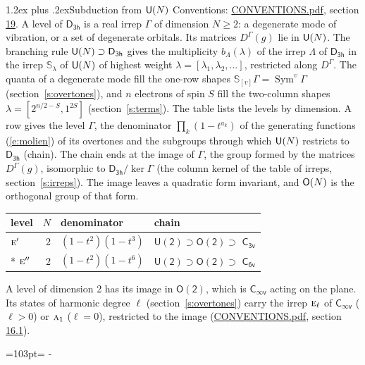 \documentclass[10pt,a4paper]{article}
\makeatletter
\renewcommand\section{\@startsection{section}{1}{\z@}{-3ex plus -1ex minus -.2ex}%
  {1.2ex plus .2ex}{\normalfont\large\sffamily\bfseries\color{parttitle}}}
\newcommand{\needspace}[1]{\par\penalty-100\begingroup\dimen0=#1\relax\dimen2=\pagegoal
  \advance\dimen2-\pagetotal\ifdim\dimen0>\dimen2\relax\ifdim\dimen2>0pt\vfil\break\fi\fi
  \endgroup}
\numberwithin{equation}{section}
\newcommand{\grp}[1]{\mathsf{#1}}
\newcommand{\irr}[1]{\text{\normalfont\scshape #1}}
\newcommand{\repD}[1]{D^{#1}}
\newcommand{\schur}[1]{\mathbb{S}_{#1}}
\newcommand{\shape}[1]{[#1]}
\makeatother
\begin{document}
\section{Subduction from \texorpdfstring{$\grp{U(\mathnormal{N})}$}{U(N)}}\label{s:unitary}
Conventions: \href{../../CONVENTIONS.pdf}{CONVENTIONS.pdf}, section \href{../../CONVENTIONS.pdf\#conv.19}{19}.
\leavevmode\label{n:local.level.dimension}A level of $\grp{D_{3h}}$ is a real irrep $\Gamma$ of dimension $N \ge 2$: a degenerate mode of vibration, or a set of degenerate orbitals. \label{n:group.unitary}Its matrices $\repD{\Gamma}(g)$ lie in $\grp{U(\mathnormal{N})}$. \label{n:irrep.schur}\label{n:shape.partition}\label{n:local.partition}\label{n:function.multiplicity.unitary}The branching rule $\grp{U(\mathnormal{N})} \supset \grp{D_{3h}}$ gives the multiplicity $b_\Lambda(\lambda)$ of the irrep $\Lambda$ of $\grp{D_{3h}}$ in the irrep $\schur{\lambda}$ of $\grp{U(\mathnormal{N})}$ of highest weight $\lambda = \shape{\lambda_1, \lambda_2, \dots}$, restricted along $\repD{\Gamma}$. \label{n:local.partition.power}\label{n:local.electrons}\label{n:local.spin}The quanta of a degenerate mode fill the one-row shapes $\schur{\shape{v}}\Gamma = \operatorname{Sym}^{v}\Gamma$ (section~\ref{s:overtones}), and $n$ electrons of spin $S$ fill the two-column shapes $\lambda = \shape{2^{n/2-S}, 1^{2S}}$ (section~\ref{s:terms}).
The table lists the levels by dimension. \label{n:head.level}\label{n:head.denominator}\label{n:index.overtone.denominator}\label{n:head.chain}A row gives the level $\Gamma$, the denominator $\prod_k (1 - t^{a_k})$ of the generating functions (\ref{e:molien}) of its overtones and the subgroups through which $\grp{U(\mathnormal{N})}$ restricts to $\grp{D_{3h}}$ (chain). The chain ends at the image of $\Gamma$, the group formed by the matrices $\repD{\Gamma}(g)$, isomorphic to $\grp{D_{3h}}/\ker\Gamma$ (the column kernel of the table of irreps, section~\ref{s:irreps}). The image leaves a quadratic form invariant, and $\grp{O(\mathnormal{N})}$ is the orthogonal group of that form.
{\small\begin{longtable}{@{}lrll@{}}\toprule
level & $N$ & denominator & chain\\\midrule\endhead
\bottomrule\endfoot\endlastfoot
$\irr{e}'$ & 2 & $(1-t^{2})(1-t^{3})$ & $\grp{U(2)} \supset \grp{O(2)} \supset$ \href{C3v.pdf}{$\grp{C_{3v}}$}\\*
$\irr{e}''$ & 2 & $(1-t^{2})(1-t^{6})$ & $\grp{U(2)} \supset \grp{O(2)} \supset$ \href{C6v.pdf}{$\grp{C_{6v}}$}\\
\bottomrule\end{longtable}}
A level of dimension 2 has its image in $\grp{O(2)}$, which is \href{Cinfv.pdf}{$\grp{C_{\infty v}}$} acting on the plane. \label{n:index.harmonic.degree}Its states of harmonic degree $\ell$ (section~\ref{s:overtones}) carry the irrep $\irr{e}_{\ell}$ of \href{Cinfv.pdf}{$\grp{C_{\infty v}}$} ($\ell > 0$) or $\irr{a}_{1}$ ($\ell = 0$), restricted to the image (\href{../../CONVENTIONS.pdf}{CONVENTIONS.pdf}, section \href{../../CONVENTIONS.pdf\#conv.16.1}{16.1}).
\needspace{103pt}
\end{document}
